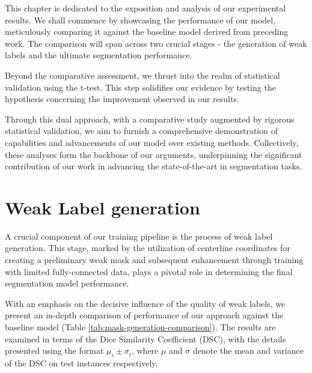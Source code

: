 This chapter is dedicated to the exposition and analysis of our experimental results. We shall commence by showcasing the performance of our model, meticulously comparing it against the baseline model derived from preceding work. The comparison will span across two crucial stages - the generation of weak labels and the ultimate segmentation performance.

Beyond the comparative assessment, we thrust into the realm of statistical validation using the t-test. This step solidifies our evidence by testing the hypothesis concerning the improvement observed in our results.

Through this dual approach, with a comparative study augmented by rigorous statistical validation, we aim to furnish a comprehensive demonstration of capabilities and advancements of our model over existing methods. Collectively, these analyses form the backbone of our arguments, underpinning the significant contribution of our work in advancing the state-of-the-art in segmentation tasks.

\section{Weak Label generation}

A crucial component of our training pipeline is the process of weak label generation. This stage, marked by the utilization of centerline coordinates for creating a preliminary weak mask and subsequent enhancement through training with limited fully-connected data, plays a pivotal role in determining the final segmentation model performance.

With an emphasis on the decisive influence of the quality of weak labels, we present an in-depth comparison of performance of our approach against the baseline model (Table \ref{tab:mask-generation-comparison}). The results are examined in terms of the Dice Similarity Coefficient (DSC), with the details presented using the format \(\mu_i \pm \sigma_{i}\), where \(\mu\) and \(\sigma\) denote the mean and variance of the DSC on test instances respectively.

